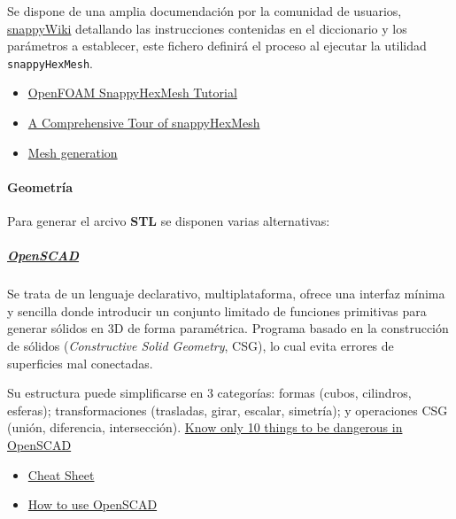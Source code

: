 Se dispone de una amplia documendación por la comunidad de usuarios,
\href{https://sites.google.com/site/snappywiki/snappyhexmesh/snappyhexmeshdict\#TOC-geometry}{snappyWiki}
detallando las instrucciones contenidas en el diccionario y los
parámetros a establecer, este fichero definirá el proceso al ejecutar la
utilidad \texttt{snappyHexMesh}.

\begin{itemize}
\item
  \href{https://www.youtube.com/watch?v=ObsFQUiVi1U}{OpenFOAM
  SnappyHexMesh Tutorial}
\item
  \href{https://openfoamwiki.net/images/f/f0/Final-AndrewJacksonSlidesOFW7.pdf}{A
  Comprehensive Tour of snappyHexMesh}
\item
  \href{http://hmf.enseeiht.fr/travaux/projnum/book/export/html/1467}{Mesh
  generation}
\end{itemize}

\paragraph{Geometría}\label{header-n94}

Para generar el arcivo \textbf{STL} se disponen varias alternativas:

\subparagraph{\texorpdfstring{
\href{www.openscad.org}{OpenSCAD}}{OpenSCAD}}\label{header-n97}

Se trata de un lenguaje declarativo, multiplataforma, ofrece una
interfaz mínima y sencilla donde introducir un conjunto limitado de
funciones primitivas para generar sólidos en 3D de forma paramétrica.
Programa basado en la construcción de sólidos (\emph{Constructive Solid
Geometry}, CSG), lo cual evita errores de superficies mal conectadas.

Su estructura puede simplificarse en 3 categorías: formas (cubos,
cilindros, esferas); transformaciones (trasladas, girar, escalar,
simetría); y operaciones CSG (unión, diferencia, intersección).
\href{https://cubehero.com/2013/11/19/know-only-10-things-to-be-dangerous-in-openscad/}{Know
only 10 things to be dangerous in OpenSCAD}

\begin{itemize}
\item
  \href{http://www.openscad.org/documentation.html}{Cheat Sheet}
\item
  \href{http://www.tridimake.com/2014/11/howto-openscad-iteration-extrusion.html}{How
  to use OpenSCAD}
\end{itemize}

